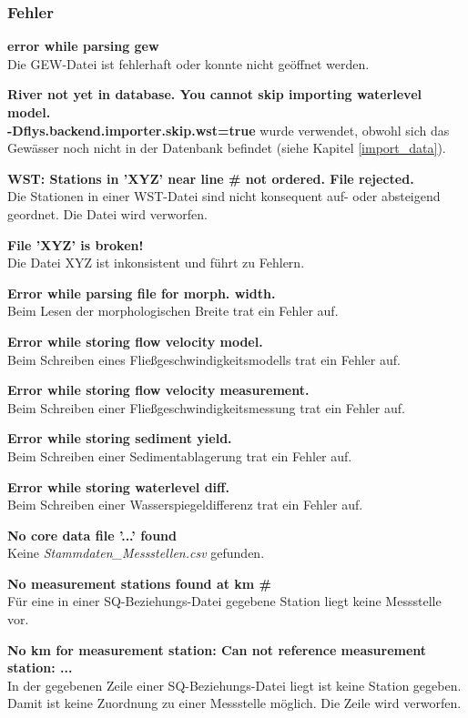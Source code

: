 \subsubsection{Fehler}

\textbf{error while parsing gew}
\\Die GEW-Datei ist fehlerhaft oder konnte nicht geöffnet werden.

\textbf{River not yet in database. You cannot skip importing waterlevel model.}
\\\textbf{-Dflys.backend.importer.skip.wst=true} wurde verwendet,
obwohl sich das Gewässer noch nicht in der Datenbank befindet
(siehe Kapitel \ref{import_data}).

\textbf{WST: Stations in 'XYZ' near line \# not ordered. File rejected.}
\\Die Stationen in einer WST-Datei sind nicht konsequent auf- oder
absteigend geordnet. Die Datei wird verworfen.

\textbf{File 'XYZ' is broken!}
\\Die Datei XYZ ist inkonsistent und führt zu Fehlern.

\textbf{Error while parsing file for morph. width.}
\\Beim Lesen der morphologischen Breite trat ein Fehler auf.

\textbf{Error while storing flow velocity model.}
\\Beim Schreiben eines Fließgeschwindigkeitsmodells trat ein Fehler auf.

\textbf{Error while storing flow velocity measurement.}
\\Beim Schreiben einer Fließgeschwindigkeitsmessung trat ein Fehler auf.

\textbf{Error while storing sediment yield.}
\\Beim Schreiben einer Sedimentablagerung trat ein Fehler auf.

\textbf{Error while storing waterlevel diff.}
\\Beim Schreiben einer Wasserspiegeldifferenz trat ein Fehler auf.

\textbf{No core data file '...' found}
\\Keine \textit{Stammdaten\_Messstellen.csv} gefunden.

\textbf{No measurement stations found at km \#}
\\Für eine in einer SQ-Beziehungs-Datei gegebene Station liegt
keine Messstelle vor.

\textbf{No km for measurement station: Can not reference measurement station: ...}
\\In der gegebenen Zeile einer SQ-Beziehungs-Datei liegt ist keine
Station gegeben. Damit ist keine Zuordnung zu einer Messstelle möglich.
Die Zeile wird verworfen.

